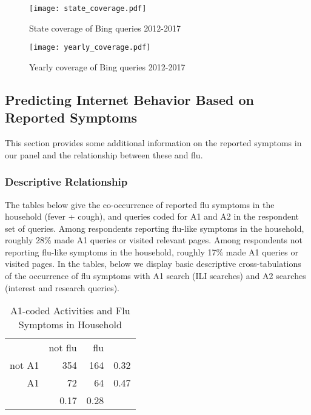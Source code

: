 \documentclass[12pt]{article}
\begin{document}
\begin{figure}[!htbp]
\begin{centering}
   \texttt{[image: state\_coverage.pdf]}
  \caption{State coverage of Bing queries 2012-2017}
\label{state_coverage}
\end{centering}
\end{figure}

\begin{figure}[!htbp]
\begin{centering}
   \texttt{[image: yearly\_coverage.pdf]}
  \caption{Yearly coverage of Bing queries 2012-2017}
\label{year_coverage}
\end{centering}
\end{figure}

\subsection{Predicting Internet Behavior Based on Reported Symptoms}

This section provides some additional information on the reported symptoms in our panel and the relationship between these and flu.

\subsubsection{Descriptive Relationship}

The tables below give the co-occurrence of reported flu symptoms in the household (fever + cough), and queries coded for A1 and A2 in the respondent set of queries. Among respondents reporting flu-like symptoms in the household, roughly 28\% made A1 queries or visited relevant pages. Among respondents not reporting flu-like symptoms in the household, roughly 17\% made A1 queries or visited pages. In the tables, below we display basic descriptive cross-tabulations of the occurrence of flu symptoms with A1 search (ILI searches) and A2 searches (interest and research queries).

\begin{table}[!htbp]
\centering
  \caption{A1-coded Activities and Flu Symptoms in Household}
  \label{descript3}
\begin{tabular}{rrrr}
  \hline
    & not flu &  flu & \\
not A1 & 354 & 164 & 0.32\\
A1 & 72 & 64 & 0.47 \\
   \hline
   & 0.17 & 0.28 &  \\
   \hline
\end{tabular}
\end{table}
\end{document}

